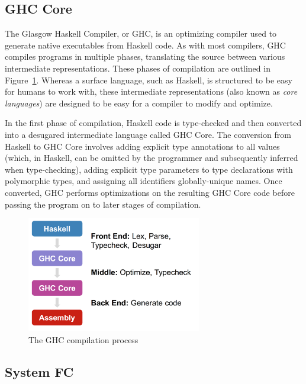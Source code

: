 \documentclass{sig-alternate}
\begin{document}
\subsection{GHC Core}
\label{sec:background-ghc-core}

The Glasgow Haskell Compiler, or GHC, is an optimizing compiler used to generate native executables from Haskell code. As with most compilers, GHC compiles programs in multiple phases, translating the source between various intermediate representations. These phases of compilation are outlined in Figure~\ref{fig:desgar}. Whereas a surface language, such as Haskell, is structured to be easy for humans to work with, these intermediate representations (also known as {\em core languages}) are designed to be easy for a compiler to modify and optimize.

In the first phase of compilation, Haskell code is type-checked and then converted into a desugared intermediate language called GHC Core. The conversion from Haskell to GHC Core involves adding explicit type annotations to all values (which, in Haskell, can be omitted by the programmer and subsequently inferred when type-checking), adding explicit type parameters to type declarations with polymorphic types, and assigning all identifiers globally-unique names. Once converted, GHC performs optimizations on the resulting GHC Core code before passing the program on to later stages of compilation.

\begin{figure}[h!]
  \centering
  \includegraphics[max width=3in]{desgar.png}
  \caption{The GHC compilation process}
  \label{fig:desgar}
\end{figure}


\subsection{System FC}
\label{sec:background-fc}
\end{document}
